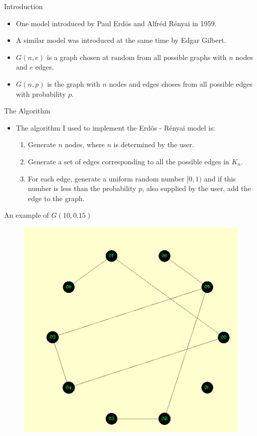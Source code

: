 \documentclass{beamer}
\begin{document}
\begin{frame}{Introduction}
\begin{itemize}
\item One model introduced by Paul Erd\"os and Alfr\'ed R\'enyai in 1959.
\item A similar model was introduced at the same time by Edgar Gilbert.
\item $G(n,e)$ is a graph chosen at random from all possible graphs with $n$ nodes and $e$ edges.
\item $G(n,p)$ is the graph with $n$ nodes and edges choses from all possible edges with probability $p$.
\end{itemize}
\end{frame}

\begin{frame}{The Algorithm}
\begin{itemize}
\item The algorithm I used to implement the Erd\"os - R\'enyai model is:
\begin{enumerate}
\item Generate $n$ nodes, where $n$ is determined by the user.
\item Generate a set of edges corresponding to all the possible edges in $K_n$.
\item For each edge, generate a uniform random number $[0,1)$ and if this number is less than the probability $p$, also supplied by the user, add the edge to the graph.
\end{enumerate}
\end{itemize}
\end{frame}

\begin{frame}{An example of $G(10,0.15)$}
\begin{figure}
\includegraphics[width= .5\paperwidth]{ERpic.jpg}
\end{figure}
\end{frame}
\end{document}
